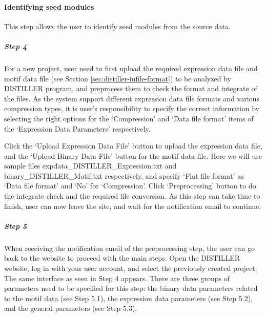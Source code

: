 \paragraph{Identifying seed modules} This step allows the user to identify 
seed modules from the source data.


\vspace{-5mm}\begin{adjustwidth}{3mm}{0cm}
\nointerlineskip\leavevmode
\subparagraph{Step 4} For a new project, user need to first upload the required 
expression data file and motif data file (see Section 
\ref{sec:distiller-infile-format}) to be analyzed by DISTILLER program, and 
preprocess them to check the format 
and integrate of the files.
As the system support different expression data file formats and various 
compression types, it is user's responsibility to specify the correct 
information by selecting the right options for the `Compression' and `Data file 
format' items of the `Expression Data Parameters' respectively.

Click the `Upload Expression Data File' button to upload the expression data 
file, and the `Upload Binary Data File' button for the motif data file. Here we 
will use sample files expdata\_DISTILLER\_Expression.txt and 
binary\_DISTILLER\_Motif.txt respectively, and specify `Flat file format' as 
`Data file format' and `No' for `Compression'. 
Click `Preprocessing' button to do the integrate check and the required file 
conversion. As this step can take time to finish, user can now leave the site, 
and wait for the notification email to continue.


\subparagraph{Step 5} When receiving the notification email of the 
preprocessing step, the user can go back to the website to proceed with the 
main steps.  
Open the DISTILLER website, log in with your user account, and select the 
previously created project. The same interface as seen in Step 4 appears.
There are three groups of parameters need to be specified for this step: the 
binary data parameters related to the 
motif data (see Step 5.1), the expression data parameters (see Step 5.2), and 
the general parameters (see Step 5.3).


\end{adjustwidth}
